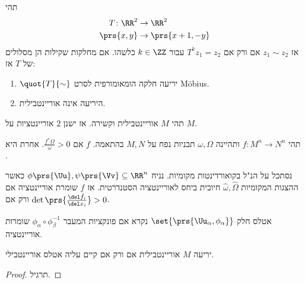 \documentclass[a4paper,10pt,twoside,openany]{book}
\begin{document}
\begin{example}
תהי
\begin{align*}
T \colon \RR^2 &\to \RR^2 \\
\prs{x,y} &\to \prs{x+1, -y}
\end{align*}
אז
$z_1 \sim z_2$
אם ורק אם
$T^k z_1 = z_2$
עבור
$k \in \ZZ$
כלשהו.
אם מחלקות שקילות הן מסלולים של
$T$
אז:
\begin{exercise}
\begin{enumerate}
\item $\quot{T}{\sim}$
יריעה חלקה הומאומורפית לסרט
\textenglish{Möbius}.
\item היריעה אינה אוריינטבילית.
\end{enumerate}
\end{exercise}
\end{example}
\begin{exercise}
תהי
$M$
אוריינטבילית וקשירה. אז ישנן
$2$
אוריינטציות על
$M$.
\end{exercise}
\begin{definition}
תהי
$f \colon M^n \to N^n$
ותהיינה
$\omega, \Omega$
תבניות נפח על
$M, N$
בהתאמה.
$f$
אם
$\frac{f^* \Omega}{\omega} > 0$.
אחרת היא
.
\end{definition}
\begin{remark}
נסתכל
על הנ"ל
בקואורדינטות מקומיות.
נניח
$\phi\prs{\Uu}, \psi\prs{\Vv} \subseteq \RR^n$
כאשר ההצגות המקומיות
$\hat{\omega}, \hat{\Omega}$
חיובית ביחס לאוריינטציה הסטנדרטית.
אז
$f$
שומרת אוריינטציה אם ורק אם
$\det \prs{\frac{\del \hat{f_i}}{\del x_i}} > 0$.
\end{remark}

\begin{definition}
אטלס חלק
$\set{\prs{\Uu_{\alpha}, \phi_{\alpha}}}$
נקרא
אם פונקציות המעבר
$\phi_{\alpha} \circ \phi_{\beta}^{-1}$
שומרות אוריינטציה.
\end{definition}

\begin{theorem}
יריעה
$M$
אוריינטבילית אם ורק אם קיים עליה אטלס אוריינטבילי.
\end{theorem}
\begin{proof}
תרגיל.
\end{proof}
\end{document}
